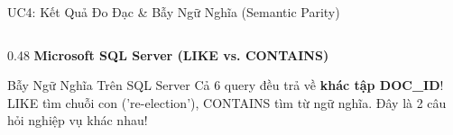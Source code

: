 \documentclass[aspectratio=169,9pt]{beamer}
\begin{document}
\begin{frame}{UC4: Kết Quả Đo Đạc \& Bẫy Ngữ Nghĩa (Semantic Parity)}
\begin{columns}[T]
\begin{column}{0.48\textwidth}
\textbf{Microsoft SQL Server (LIKE vs. CONTAINS)}
\begin{table}
\centering\scriptsize
{}
\end{table}
\begin{alertblock}{Bẫy Ngữ Nghĩa Trên SQL Server}
\scriptsize
Cả 6 query đều trả về \textbf{khác tập DOC\_ID}! LIKE tìm chuỗi con ('re-election'), CONTAINS tìm từ ngữ nghĩa. Đây là 2 câu hỏi nghiệp vụ khác nhau!
\end{alertblock}
\end{column}


\end{columns}
\end{frame}
\end{document}
